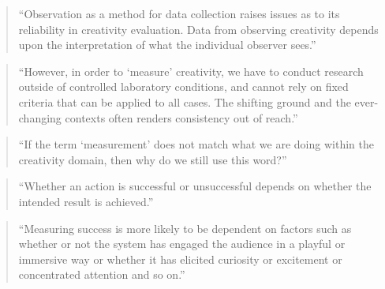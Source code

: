 \begin{quote}
  ``Observation as a method for data collection raises issues as to its reliability in creativity evaluation. Data from observing creativity depends upon the interpretation of what the individual observer sees.'' \autocite[p.22]{Candy2012}
\end{quote}

\begin{quote}
  ``However, in order to ‘measure’ creativity, we have to conduct research outside of controlled laboratory conditions, and cannot rely on fixed criteria that can be applied to all cases. The shifting ground and the ever-changing contexts often renders consistency out of reach.'' \autocite[p.22]{Candy2012}
\end{quote}

\begin{quote}
  ``If the term `measurement' does not match what we are doing within the creativity domain, then why do we still use this word?'' \autocite[p.22]{Candy2012}
\end{quote}

\begin{quote}
  ``Whether an action is successful or unsuccessful depends on whether the intended result is achieved.'' \autocite[p.23]{Candy2012}
\end{quote}

\begin{quote}
  ``Measuring success is more likely to be dependent on factors such as whether or not the system has engaged the audience in a playful or immersive way or whether it has elicited curiosity or excitement or concentrated attention and so on.'' \autocite[p.23]{Candy2012}
\end{quote}



